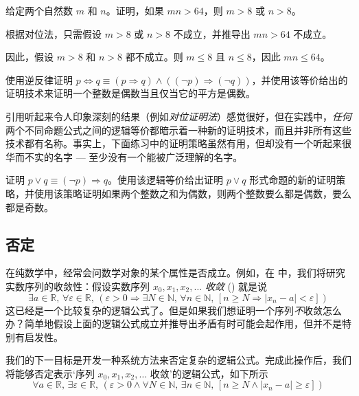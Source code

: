 \begin{example}
给定两个自然数 $m$ 和 $n$。证明，如果 $mn > 64$，则 $m>8$ 或 $n>8$。

根据对位法，只需假设 $m > 8$ 或 $n > 8$ 不成立，并推导出 $mn > 64$ 不成立。

因此，假设 $m>8$ 和 $n>8$ 都不成立。则 $m \le 8$ 且 $n \le 8$，因此 $mn \le 64$。
\end{example}

\begin{exercise}
使用逆反律证明 $p \Leftrightarrow q \equiv (p \Rightarrow q) \wedge ((\neg p) \Rightarrow (\neg q))$，并使用该等价给出的证明技术来证明一个整数是偶数当且仅当它的平方是偶数。
\end{exercise}

引用听起来令人印象深刻的结果（例如\textit{对位证明法}）感觉很好，但在实践中，\textit{任何}两个不同命题公式之间的逻辑等价都暗示着一种新的证明技术，而且并非所有这些技术都有名称。事实上，下面练习中的证明策略虽然有用，但却没有一个听起来很华而不实的名字 --- 至少没有一个能被广泛理解的名字。

\begin{exercise}
证明 $p \vee q \equiv (\neg p) \Rightarrow q$。使用该逻辑等价给出证明 $p \vee q$ 形式命题的新的证明策略，并使用该策略证明如果两个整数之和为偶数，则两个整数要么都是偶数，要么都是奇数。
\end{exercise}

\subsection*{否定}

在纯数学中，经常会问数学对象的某个属性是否成立。例如，在  中，我们将研究实数序列的收敛性：假设实数序列 $x_0,x_1,x_2,\dots$ \textit{收敛}\label{pConvergencePreliminary} () 就是说
\[ \exists a \in \mathbb{R},\, \forall \varepsilon \in \mathbb{R},\, (\varepsilon > 0 \Rightarrow \exists N \in \mathbb{N},\, \forall n \in \mathbb{N},\, [n \ge N \Rightarrow |x_n-a| < \varepsilon])\]
这已经是一个比较复杂的逻辑公式了。但是如果我们想证明一个序列\textit{不}收敛怎么办？简单地假设上面的逻辑公式成立并推导出矛盾有时可能会起作用，但并不是特别有启发性。

我们的下一目标是开发一种系统方法来否定复杂的逻辑公式。完成此操作后，我们将能够否定表示`序列 $x_0, x_1, x_2, \dots$ 收敛'的逻辑公式，如下所示
\[ \forall a \in \mathbb{R},\, \exists \varepsilon \in \mathbb{R},\, (\varepsilon > 0 \wedge \forall N \in \mathbb{N},\, \exists n \in \mathbb{N},\, [n \ge N \wedge |x_n-a| \ge \varepsilon])\]

